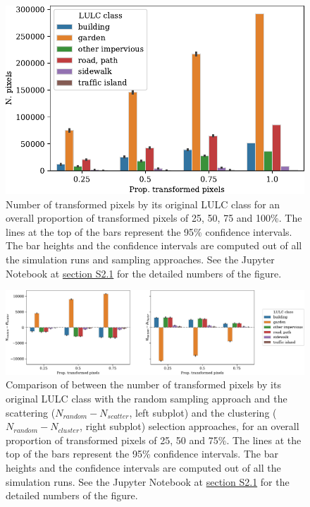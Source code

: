 \documentclass[10pt,letterpaper]{article}
\begin{document}
\begin{figure}[H]
  \centering
  \includegraphics[width=.6\textwidth]{figures/scenario-lulc-barplot}%
  \caption{\label{fig:scenario-lulc-barplot} Number of transformed pixels by its original LULC class for an overall proportion of transformed pixels of 25, 50, 75 and 100\%. The lines at the top of the bars represent the 95\% confidence intervals. The bar heights and the confidence intervals are computed out of all the simulation runs and sampling approaches. See the Jupyter Notebook at \hyperref[sec:si-scenarios]{section S2.1} for the detailed numbers of the figure.}
\end{figure}

\begin{figure}[H]
  \begin{adjustwidth}{-.4\textwidth}{0cm}  
    \centering
    \includegraphics[width=\linewidth]{figures/scenario-lulc-barplot-comparison}
    \caption{\label{fig:scenario-lulc-barplot-comparison}
      Comparison of between the number of transformed pixels by its original LULC class with the random sampling approach and the scattering ($N_{random} - N_{scatter}$, left subplot) and the clustering ($N_{random} - N_{cluster}$, right subplot) selection approaches, for an overall proportion of transformed pixels of 25, 50 and 75\%.
      The lines at the top of the bars represent the 95\% confidence intervals. The bar heights and the confidence intervals are computed out of all the simulation runs. See the Jupyter Notebook at \hyperref[sec:si-scenarios]{section S2.1} for the detailed numbers of the figure.}
  \end{adjustwidth}
\end{figure}
\end{document}
